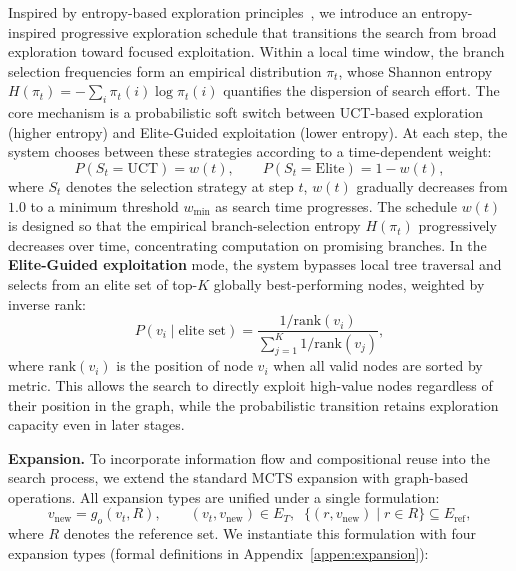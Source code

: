 Inspired by entropy-based exploration principles~\citep{jaynes1957information}, we introduce an entropy-inspired progressive exploration schedule that transitions the search from broad exploration toward focused exploitation. Within a local time window, the branch selection frequencies form an empirical distribution $\pi_t$, whose Shannon entropy $H(\pi_t) = -\sum_i \pi_t(i)\log \pi_t(i)$ quantifies the dispersion of search effort. The core mechanism is a probabilistic soft switch between UCT-based exploration (higher entropy) and Elite-Guided exploitation (lower entropy). At each step, the system chooses between these strategies according to a time-dependent weight:
\begin{equation}
\label{eq:soft_switch}
P(S_t = \text{UCT}) = w(t), \qquad
P(S_t = \text{Elite}) = 1 - w(t),
\end{equation}
where $S_t$ denotes the selection strategy at step $t$, $w(t)$ gradually decreases from $1.0$ to a minimum threshold $w_{\min}$ as search time progresses. The schedule $w(t)$ is designed so that the empirical branch-selection entropy $H(\pi_t)$ progressively decreases over time, concentrating computation on promising branches. In the \textbf{Elite-Guided exploitation} mode, the system bypasses local tree traversal and selects from an elite set of top-$K$ globally best-performing nodes, weighted by inverse rank:
\begin{equation}
\label{eq:elite}
P(v_i \mid \text{elite set}) =
\frac{1/\text{rank}(v_i)}
{\sum_{j=1}^{K} 1/\text{rank}(v_j)},
\end{equation}
where $\text{rank}(v_i)$ is the position of node $v_i$ when all valid nodes are sorted by metric. This allows the search to directly exploit high-value nodes regardless of their position in the graph, while the probabilistic transition retains exploration capacity even in later stages.


\textbf{Expansion.}
To incorporate information flow and compositional reuse into the search process, we extend the standard MCTS expansion with graph-based operations. All expansion types are unified under a single formulation:
\begin{equation}
\label{eq:expansion}
v_{\text{new}} = g_{o}(v_{t}, R), \qquad (v_{t}, v_{\text{new}}) \in E_{T}, \;\; \{(r, v_{\text{new}}) \mid r \in R\} \subseteq E_{\text{ref}},
\end{equation}
where $R$ denotes the reference set. We instantiate this formulation with four expansion types (formal definitions in Appendix~\ref{appen:expansion}):

